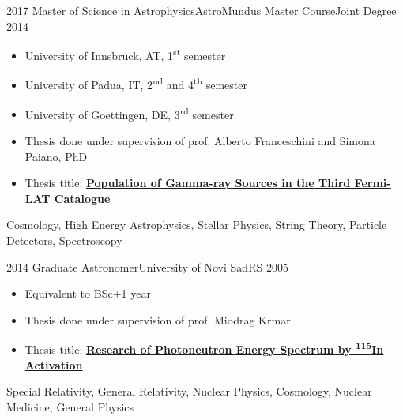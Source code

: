 

\begin{experiences}
  \experience
    {2017}   {Master of Science in Astrophysics}{AstroMundus Master Course}{Joint Degree}
    {2014} {
                      \begin{itemize}
                        \item University of Innsbruck, AT, 1\textsuperscript{st} semester                       
                        \item University of Padua, IT, 2\textsuperscript{nd} and 4\textsuperscript{th} semester                   
                        \item University of Goettingen, DE, 3\textsuperscript{rd} semester                
                        \item Thesis done under supervision of prof. Alberto Franceschini and Simona Paiano, PhD     
                        
                        \item Thesis title: \href{http://tesi.cab.unipd.it/54536/1/sarcevic_tesi.pdf}{\textbf{Population of Gamma-ray Sources in the Third Fermi-LAT Catalogue}}
                        
                      \end{itemize}
                    }
                    {Cosmology, High Energy Astrophysics, Stellar Physics, String Theory, Particle Detectors, Spectroscopy}
  \emptySeparator
  
    \experience
    {2014}   {Graduate Astronomer}{University of Novi Sad}{RS}
    {2005} {
                      \begin{itemize}
                        \item Equivalent to BSc+1 year                       
                        \item Thesis done under supervision of prof. Miodrag Krmar  \item Thesis title: \href{https://www.df.uns.ac.rs/wp-content/uploads/publikacije/nikolina_sarcevic_-_diplomski_rad_(d-658).pdf}{ \textbf{Research of Photoneutron Energy Spectrum by \textsuperscript{115}In Activation}}           
                         \end{itemize}
                    }
                    {Special Relativity, General Relativity, Nuclear Physics, Cosmology, Nuclear Medicine, General Physics}
\end{experiences}
